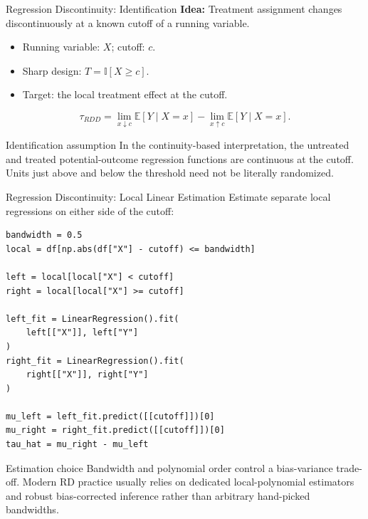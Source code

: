 \documentclass[aspectratio=169,11pt]{beamer}
\begin{document}
\begin{frame}{Regression Discontinuity: Identification}
\textbf{Idea:} Treatment assignment changes discontinuously at a known cutoff of a running variable.

\begin{itemize}
  \item Running variable: $X$; cutoff: $c$.
  \item Sharp design: $T=\mathbb{I}[X\ge c]$.
  \item Target: the local treatment effect at the cutoff.
\end{itemize}

\[
  \tau_{RDD}
  = \lim_{x\downarrow c}\mathbb{E}[Y\mid X=x]
  - \lim_{x\uparrow c}\mathbb{E}[Y\mid X=x].
\]

\begin{alertblock}{Identification assumption}
In the continuity-based interpretation, the untreated and treated potential-outcome regression functions are continuous at the cutoff. Units just above and below the threshold need not be literally randomized.
\end{alertblock}
\end{frame}

\begin{frame}[fragile]{Regression Discontinuity: Local Linear Estimation}
Estimate separate local regressions on either side of the cutoff:

\begin{lstlisting}[style=code,basicstyle=\ttfamily\small]
bandwidth = 0.5
local = df[np.abs(df["X"] - cutoff) <= bandwidth]

left = local[local["X"] < cutoff]
right = local[local["X"] >= cutoff]

left_fit = LinearRegression().fit(
    left[["X"]], left["Y"]
)
right_fit = LinearRegression().fit(
    right[["X"]], right["Y"]
)

mu_left = left_fit.predict([[cutoff]])[0]
mu_right = right_fit.predict([[cutoff]])[0]
tau_hat = mu_right - mu_left
\end{lstlisting}

\begin{block}{Estimation choice}
Bandwidth and polynomial order control a bias-variance trade-off. Modern RD practice usually relies on dedicated local-polynomial estimators and robust bias-corrected inference rather than arbitrary hand-picked bandwidths.
\end{block}
\end{frame}
\end{document}
